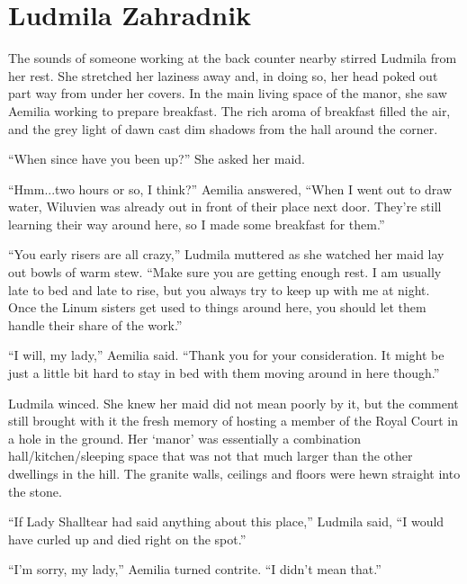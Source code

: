 \chapter{Ludmila Zahradnik}

The sounds of someone working at the back counter nearby stirred Ludmila from her rest. She stretched her laziness away and, in doing so, her head poked out part way from under her covers. In the main living space of the manor, she saw Aemilia working to prepare breakfast. The rich aroma of breakfast filled the air, and the grey light of dawn cast dim shadows from the hall around the corner.

 

“When since have you been up?” She asked her maid.

 

“Hmm...two hours or so, I think?” Aemilia answered, “When I went out to draw water, Wiluvien was already out in front of their place next door. They’re still learning their way around here, so I made some breakfast for them.”

 

“You early risers are all crazy,” Ludmila muttered as she watched her maid lay out bowls of warm stew. “Make sure you are getting enough rest. I am usually late to bed and late to rise, but you always try to keep up with me at night. Once the Linum sisters get used to things around here, you should let them handle their share of the work.”

 

“I will, my lady,” Aemilia said. “Thank you for your consideration. It might be just a little bit hard to stay in bed with them moving around in here though.”

 

Ludmila winced. She knew her maid did not mean poorly by it, but the comment still brought with it the fresh memory of hosting a member of the Royal Court in a hole in the ground. Her ‘manor’ was essentially a combination hall/kitchen/sleeping space that was not that much larger than the other dwellings in the hill. The granite walls, ceilings and floors were hewn straight into the stone.

 

“If Lady Shalltear had said anything about this place,” Ludmila said, “I would have curled up and died right on the spot.”

 

“I’m sorry, my lady,” Aemilia turned contrite. “I didn’t mean that.”

